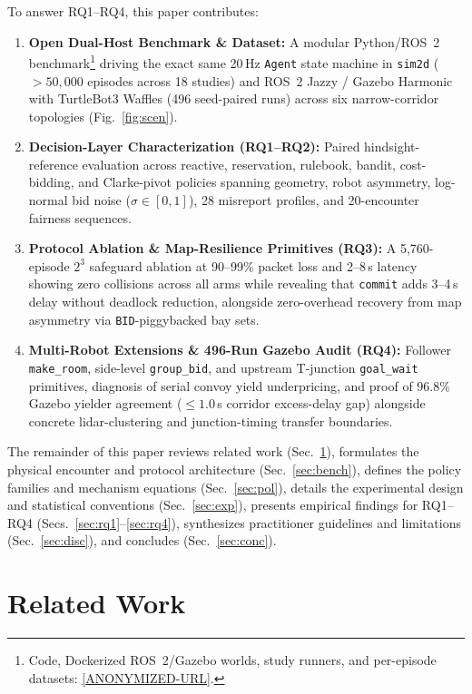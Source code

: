 \documentclass[letterpaper,journal]{IEEEtran}
\newcommand{\gb}{\texttt{group\_bid}}
\begin{document}
To answer RQ1--RQ4, this paper contributes:
\begin{enumerate}
\item \textbf{Open Dual-Host Benchmark \& Dataset:} A modular Python/ROS~2 benchmark\footnote{Code, Dockerized ROS~2/Gazebo worlds, study runners, and per-episode datasets: \url{[ANONYMIZED-URL]}.} %
driving the exact same 20\,Hz \texttt{Agent} state machine in \texttt{sim2d} ($>50{,}000$ episodes across 18 studies) and ROS~2 Jazzy / Gazebo Harmonic with TurtleBot3 Waffles (496 seed-paired runs) across six narrow-corridor topologies (Fig.~\ref{fig:scen}).
\item \textbf{Decision-Layer Characterization (RQ1--RQ2):} Paired hindsight-reference evaluation across reactive, reservation, rulebook, bandit, cost-bidding, and Clarke-pivot policies spanning geometry, robot asymmetry, log-normal bid noise ($\sigma\in[0,1]$), 28 misreport profiles, and 20-encounter fairness sequences.
\item \textbf{Protocol Ablation \& Map-Resilience Primitives (RQ3):} A 5,760-episode $2^3$ safeguard ablation at 90--99\% packet loss and 2--8\,s latency showing zero collisions across all arms while revealing that \texttt{commit} adds 3--4\,s delay without deadlock reduction, alongside zero-overhead recovery from map asymmetry via \texttt{BID}-piggybacked bay sets.
\item \textbf{Multi-Robot Extensions \& 496-Run Gazebo Audit (RQ4):} Follower \texttt{make\_room}, side-level \gb, and upstream T-junction \texttt{goal\_wait} primitives, diagnosis of serial convoy yield underpricing, and proof of $96.8\%$ Gazebo yielder agreement ($\le 1.0$\,s corridor excess-delay gap) alongside concrete lidar-clustering and junction-timing transfer boundaries.
\end{enumerate}

The remainder of this paper reviews related work (Sec.~\ref{sec:rel}), formulates the physical encounter and protocol architecture (Sec.~\ref{sec:bench}), defines the policy families and mechanism equations (Sec.~\ref{sec:pol}), details the experimental design and statistical conventions (Sec.~\ref{sec:exp}), presents empirical findings for RQ1--RQ4 (Secs.~\ref{sec:rq1}--\ref{sec:rq4}), synthesizes practitioner guidelines and limitations (Sec.~\ref{sec:disc}), and concludes (Sec.~\ref{sec:conc}).

\section{Related Work}\label{sec:rel}
\end{document}
